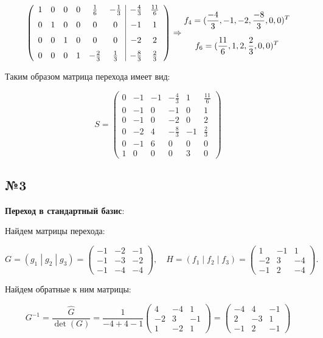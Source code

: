 \documentclass[11pt]{article}
\begin{document}
$$\begin{gathered}
\begin{pmatrix}
\begin{array}{c c c c c c|c c}
1 & 0 & 0 & 0 & \tfrac{1}{6} & -\tfrac{1}{3} & -\tfrac{4}{3} & \tfrac{11}{6}\\[6pt]
0 & 1 & 0 & 0 & 0 & 0 & -1 & 1 \\[6pt]
0 & 0 & 1 & 0 & 0 & 0 & -2 & 2 \\[6pt]
0 & 0 & 0 & 1 & -\tfrac{2}{3} & \tfrac{1}{3}  & -\tfrac{8}{3} & \tfrac{2}{3}
\end{array}
\end{pmatrix} \Rightarrow \begin{gathered}
f_4 = (\frac{-4}{3}, -1, -2, \frac{-8}{3}, 0, 0)^T \\[6pt]
f_6 = (\frac{11}{6}, 1, 2, \frac{2}{3}, 0, 0)^T
\end{gathered}
\end{gathered}
$$

Таким образом матрица перехода имеет вид:

$$
S =
\begin{pmatrix}
0 & -1 & -1 & -\frac{4}{3} & 1 & \frac{11}{6}\\[6pt]
0 & -1 & 0 & -1 & 0 & 1\\[6pt]
0 & -1 & 0 & -2 & 0 & 2\\[6pt]
0 & -2 & 4 & -\frac{8}{3} & -1 & \frac{2}{3}\\[6pt]
0 & -1 & 6 & 0 & 0 & 0\\[6pt]
1 & 0 & 0 & 0 & 3 & 0
\end{pmatrix}
$$

\subsection*{№3}
\textbf{Переход в стандартный базис}:

Найдем матрицы перехода:

$$
G = (g_1 \;|\; g_2 \;|\; g_3)
=\begin{pmatrix}
-1 & -2 & -1\\
-1 & -3 & -2\\
-1 & -4 & -4
\end{pmatrix},\quad
H = (f_1 \;|\; f_2 \;|\; f_3)
=\begin{pmatrix}
1 & -1 & 1\\
-2 & 3  & -4\\
-1 & 2  & -4
\end{pmatrix}.
$$

Найдем обратные к ним матрицы:

$$
G^{-1} = \frac{\hat{G}}{\det(G)} = \frac{1}{-4+4-1}
\begin{pmatrix}
4 & -4 & 1\\
-2 & 3 & -1\\
1 & -2 & 1
\end{pmatrix} = 
\begin{pmatrix}
-4 & 4 & -1 \\
2 & -3 & 1 \\
-1 & 2 & -1
\end{pmatrix}
$$
\end{document}
